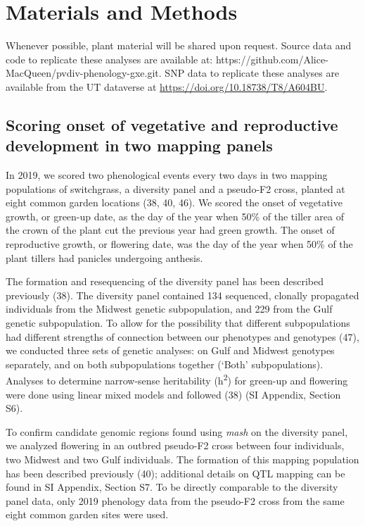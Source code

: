 \documentclass[
  9pt,
  twocolumn,
  twoside]{pnas-new}
\begin{document}
\section{Materials and Methods}\label{materials-and-methods}

Whenever possible, plant material will be shared upon request. Source
data and code to replicate these analyses are available at:
https://github.com/Alice-MacQueen/pvdiv-phenology-gxe.git. SNP data to
replicate these analyses are available from the UT dataverse at
\url{https://doi.org/10.18738/T8/A604BU}.

\subsection{Scoring onset of vegetative and reproductive development in
two mapping
panels}\label{scoring-onset-of-vegetative-and-reproductive-development-in-two-mapping-panels}

In 2019, we scored two phenological events every two days in two mapping
populations of switchgrass, a diversity panel and a pseudo-F2 cross,
planted at eight common garden locations (38, 40, 46). We scored the
onset of vegetative growth, or green-up date, as the day of the year
when 50\% of the tiller area of the crown of the plant cut the previous
year had green growth. The onset of reproductive growth, or flowering
date, was the day of the year when 50\% of the plant tillers had
panicles undergoing anthesis.

The formation and resequencing of the diversity panel has been described
previously (38). The diversity panel contained 134 sequenced, clonally
propagated individuals from the Midwest genetic subpopulation, and 229
from the Gulf genetic subpopulation. To allow for the possibility that
different subpopulations had different strengths of connection between
our phenotypes and genotypes (47), we conducted three sets of genetic
analyses: on Gulf and Midwest genotypes separately, and on both
subpopulations together (`Both' subpopulations). Analyses to determine
narrow-sense heritability (h\textsuperscript{2}) for green-up and
flowering were done using linear mixed models and followed (38) (SI
Appendix, Section S6).

To confirm candidate genomic regions found using \emph{mash} on the
diversity panel, we analyzed flowering in an outbred pseudo-F2 cross
between four individuals, two Midwest and two Gulf individuals. The
formation of this mapping population has been described previously (40);
additional details on QTL mapping can be found in SI Appendix, Section
S7. To be directly comparable to the diversity panel data, only 2019
phenology data from the pseudo-F2 cross from the same eight common
garden sites were used.
\end{document}
